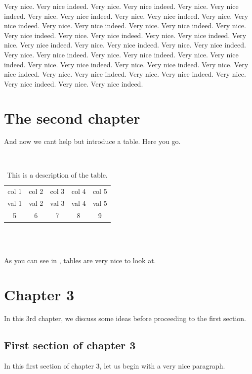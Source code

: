 \documentclass[12pt]{report}
\begin{document}
Very nice. Very nice indeed. Very nice. Very nice indeed. Very nice. Very nice indeed. Very nice. Very nice indeed. Very nice. Very nice indeed. Very nice. Very nice indeed. Very nice. Very nice indeed. Very nice. Very nice indeed. Very nice. Very nice indeed. Very nice. Very nice indeed. Very nice. Very nice indeed. Very nice. Very nice indeed. Very nice. Very nice indeed. Very nice. Very nice indeed. Very nice. Very nice indeed. Very nice. Very nice indeed. Very nice. Very nice indeed. Very nice. Very nice indeed. Very nice. Very nice indeed. Very nice. Very nice indeed. Very nice. Very nice indeed. Very nice. Very nice indeed. Very nice. Very nice indeed. Very nice. Very nice indeed.












\chapter{The second chapter}

And now we cant help but introduce a table. Here you go.


\begin{table}[t]
\centering
\noindent\hrulefill\\
\begin{tabular}{ccccc}
col 1 & col 2 & col 3 & col 4 & col 5 \\
val 1 & val 2 & val 3 & val 4 & val 5 \\
5 & 6 & 7 & 8 & 9 \\
\end{tabular}
\\\noindent\hrulefill\\
\caption[This is a table]{This is a description of the table.}
\label{table1}
\end{table}

As you can see in \label{table1}, tables are very nice to look at.


\chapter{Chapter 3}
In this 3rd chapter, we discuss some ideas before proceeding to the first section.


\section{First section of chapter 3}
In this first section of chapter 3, let us begin with a very nice paragraph.
\end{document}
